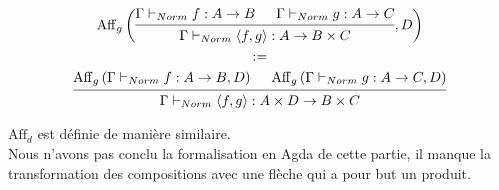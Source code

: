 \documentclass[conference]{IEEEtran}
\begin{document}
	\begin{align*}
		\begin{gathered}
			\mathrm{Aff}_g \left(
			\begin{prooftree}
				\hypo[]{\Gamma \vdash_{Norm} f : A \rightarrow B}
				\hypo[]{\Gamma \vdash_{Norm} g : A \rightarrow C}
				\infer2[]{\Gamma \vdash_{Norm} \left<f, g\right> : A \rightarrow B \times C}
			\end{prooftree}
			, D
			\right) \\
			:= \\
			\begin{prooftree}
				\hypo[]{\mathrm{Aff}_g \left( \Gamma \vdash_{Norm} f : A \rightarrow B , D \right)}
				\hypo[]{\mathrm{Aff}_g \left( \Gamma \vdash_{Norm} g : A \rightarrow C , D \right)}
				\infer2[]{\Gamma \vdash_{Norm} \left<f, g\right> : A \times D \rightarrow B \times C}
			\end{prooftree}
		\end{gathered}
	\end{align*}
	
	$\mathrm{Aff}_d$ est définie de manière similaire. \\
	
	Nous n'avons pas conclu la formalisation en Agda de cette partie, il manque la transformation des compositions avec une flèche qui a pour but un produit.
	
\end{document}
